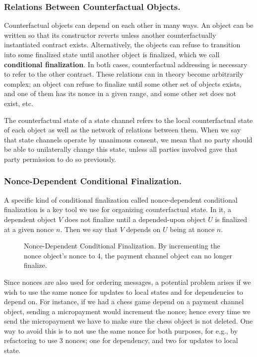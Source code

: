 \documentclass[prb,floatfix,reprint,nofootinbib,amsmath,amssymb,epsfig,pre,floats,letterpaper,groupedaffiliation,tightenlines,allcolors=blue,11pt]{revtex4}
\theoremstyle{definition}
\theoremstyle{definition}
\theoremstyle{definition}
\begin{document}
\subsubsection{Relations Between Counterfactual Objects.} \label{section:network} Counterfactual objects can depend on each other in many ways. An object can be written so that its constructor reverts unless another counterfactually instantiated contract exists. Alternatively, the objects can refuse to transition into some finalized state until another object is finalized, which we call \textbf{conditional finalization}. In both cases, counterfactual addressing is necessary to refer to the other contract. These relations can in theory become arbitrarily complex; an object can refuse to finalize until some other set of objects exists, and one of them has its nonce in a given range, and some other set does not exist, etc.

The counterfactual state of a state channel refers to the local counterfactual state of each object as well as the network of relations between them. When we say that state channels operate by unanimous consent, we mean that no party should be able to unilaterally change this state, unless all parties involved gave that party permission to do so previously.

\subsubsection{Nonce-Dependent Conditional Finalization.} A specific kind of conditional finalization called nonce-dependent conditional finalization is a key tool we use for organizing counterfactual state. In it, a dependent object $V$ does not finalize until a depended-upon object $U$ is finalized at a given nonce $n$. Then we say that $V$ depends on $U$ being at nonce $n$.

\begin{figure}[H]
    \centering
    
\caption{Nonce-Dependent Conditional Finalization. By incrementing the nonce object's nonce to 4, the payment channel object can no longer finalize.}
\end{figure}

Since nonces are also used for ordering messages, a potential problem arises if we wish to use the same nonce for updates to local states and for dependencies to depend on. For instance, if we had a chess game depend on a payment channel object, sending a micropayment would increment the nonce; hence every time we send the micropayment we have to make sure the chess object is not deleted. One way to avoid this is to not use the same nonce for both purposes, for e.g., by refactoring to use 3 nonces; one for dependency, and two for updates to local state.
\end{document}
